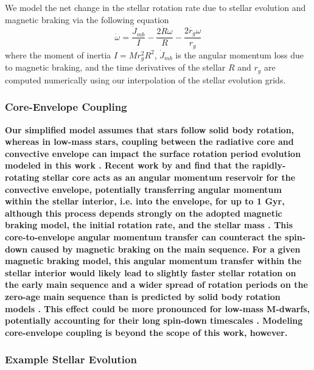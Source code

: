 \documentclass[twocolumn]{aastex61}
\newcommand{\xxx}[1]{{\textbf{#1}}}
\begin{document}
We model the net change in the stellar rotation rate due to stellar evolution and magnetic braking via the following equation 
\begin{equation} \label{eqn:stellar_rot_rate_dt}
\dot{\omega} = \frac{\dot{J}_{mb}}{I} - \frac{2 \dot{R} \omega}{R} - \frac{2 \dot{r_g} \omega}{r_g}
\end{equation}
where the moment of inertia $I = M r_g^2 R^2$, $\dot{J}_{mb}$ is the angular momentum loss due to magnetic braking, and the time derivatives of the stellar $R$ and $r_g$ are computed numerically using our interpolation of the \citet{Baraffe2015} stellar evolution grids.  

\subsubsection{\xxx{Core-Envelope Coupling}} \label{sec:methods:twoLayer}

\xxx{Our simplified model assumes that stars follow solid body rotation, whereas in low-mass stars, coupling between the radiative core and convective envelope can impact the surface rotation period evolution modeled in this work \citep{MacGregor1991,Allain1998}. Recent work by \citet{Gallet2013} and \citet{Gallet2015} find that the rapidly-rotating stellar core acts as an angular momentum reservoir for the convective envelope, potentially transferring angular momentum within the stellar interior, i.e. into the envelope, for up to 1 Gyr, although this process depends strongly on the adopted magnetic braking model, the initial rotation rate, and the stellar mass \citep{Irwin2007,Bouvier2008,Irwin2009}. This core-to-envelope angular momentum transfer can counteract the spin-down caused by magnetic braking on the main sequence. For a given magnetic braking model, this angular momentum transfer within the stellar interior would likely lead to slightly faster stellar rotation on the early main sequence and a wider spread of rotation periods on the zero-age main sequence than is predicted by solid body rotation models \citep{Gallet2013}. This effect could be more pronounced for low-mass M-dwarfs, potentially accounting for their long spin-down timescales \citep{Gallet2015}. Modeling core-envelope coupling is beyond the scope of this work, however.}

\subsubsection{\xxx{Example Stellar Evolution}} \label{sec:methods:exampleStellar}
\end{document}
